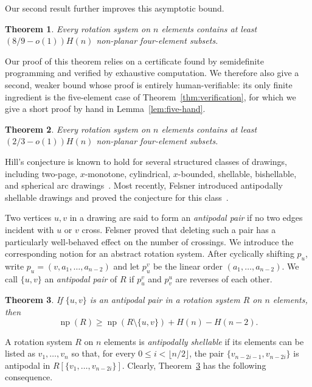 \documentclass{article}
\theoremstyle{plain}
\newtheorem{theorem}{Theorem}[section]
\theoremstyle{definition}
\theoremstyle{remark}
\newcommand{\np}{\operatorname{np}}
\begin{document}
Our second result further improves this asymptotic bound.
\begin{theorem}\label{thm:asymptotic}
Every rotation system on \(n\) elements contains at least $\left(8/9-o(1)\right)H(n)$ non-planar four-element subsets.
\end{theorem}

Our proof of this theorem relies on a certificate found by semidefinite
programming and verified by exhaustive computation.  We therefore also
give a second, weaker bound whose proof is entirely human-verifiable:
its only finite ingredient is the five-element case of
Theorem~\ref{thm:verification}, for which we give a short proof by hand
in Lemma~\ref{lem:five-hand}.
\begin{theorem}\label{thm:asymptotic_hand}
Every rotation system on \(n\) elements contains at least $(2/3 - o(1)) H(n)$ non-planar four-element subsets.
\end{theorem}

Hill's conjecture is known to hold for several structured classes of
drawings, including two-page, \(x\)-monotone, cylindrical,
\(x\)-bounded, shellable, bishellable, and spherical arc
drawings~\cite{AbregoEtAl2013,AbregoEtAl2014,AbregoEtAl2018,StreltsovaWagner2025}.
Most recently, Felsner introduced antipodally shellable drawings and
proved the conjecture for this class~\cite{Felsner2026}.

Two vertices \(u,v\) in a drawing are said to form an
\emph{antipodal pair} if no two edges incident with \(u\) or \(v\) cross.
Felsner proved that deleting such a pair has a particularly
well-behaved effect on the number of crossings.  We introduce the
corresponding notion for an abstract rotation system.  After cyclically
shifting \(p_u\), write \(p_u=(v,a_1,\ldots,a_{n-2})\) and let
\(p_u^v\) be the linear order \((a_1,\ldots,a_{n-2})\).
We call \(\{u,v\}\) an \emph{antipodal pair} of \(R\) if \(p_u^v\)
and \(p_v^u\) are reverses of each other.

\begin{theorem}\label{thm:antipodal}
If \(\{u,v\}\) is an antipodal pair in a rotation system \(R\) on
\(n\) elements, then
\[
\np(R)\geq \np(R\setminus\{u,v\})+H(n)-H(n-2).
\]
\end{theorem}

A rotation system \(R\) on \(n\) elements is \emph{antipodally
shellable} if its elements can be listed as \(v_1,\ldots,v_n\) so
that, for every \(0\leq i<\lfloor n/2\rfloor\), the pair
\(\{v_{n-2i-1},v_{n-2i}\}\) is antipodal in \(R[\{v_1,\ldots,v_{n-2i}\}]\). Clearly, Theorem~\ref{thm:antipodal} has the following consequence.
\end{document}
